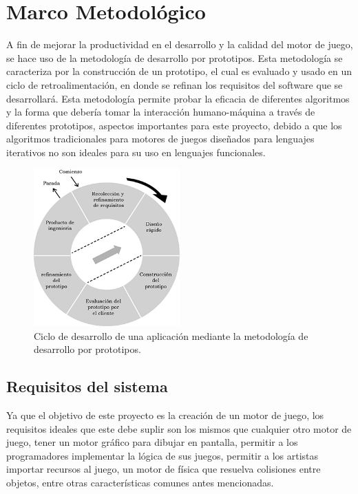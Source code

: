 
\chapter{Marco Metodológico}  %
\label{capitulo3}

\ifpdf
    \graphicspath{{metodologia/Figs/Raster/}{metodologia/Figs/PDF/}{metodologia/Figs/}}
\else
    \graphicspath{{metodologia/Figs/Vector/}{metodologia/Figs/}}
\fi

A fin de mejorar la productividad en el desarrollo y la calidad del motor de juego, se hace uso de la metodología de desarrollo por prototipos. Esta  metodología se caracteriza por la construcción de un prototipo, el cual es evaluado y usado en un ciclo de retroalimentación, en donde se refinan los requisitos del software que se desarrollará. Esta metodología permite probar la eficacia de diferentes algoritmos y la forma que debería tomar la interacción humano-máquina a través de diferentes prototipos, aspectos importantes para este proyecto, debido a que los algoritmos tradicionales para motores de juegos diseñados para lenguajes iterativos no son ideales para su uso en lenguajes funcionales.

\begin{figure}[!htbp!]
\centering
\includegraphics[width=0.5\textwidth]{metoPrototipo}
\caption[Metodología de desarrollo por prototipos]{Ciclo de desarrollo de una aplicación mediante la metodología de desarrollo por prototipos.}
\end{figure}

\section{Requisitos del sistema}

Ya que el objetivo de este proyecto es la creación de un motor de juego, los requisitos ideales que este debe suplir son los mismos que cualquier otro motor de juego, tener un motor gráfico para dibujar en pantalla, permitir a los programadores implementar la lógica de sus juegos, permitir a los artistas importar recursos al juego, un motor de física que resuelva colisiones entre objetos, entre otras características comunes antes mencionadas.

